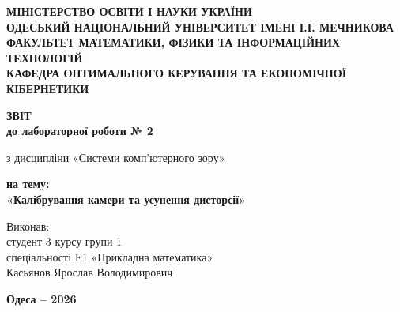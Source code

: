 \begin{titlepage}
    \thispagestyle{empty}
    \setlength{\parindent}{0pt}
    
    \begin{center}
        {\fontsize{12pt}{16pt}\selectfont\bfseries
        МІНІСТЕРСТВО ОСВІТИ І НАУКИ УКРАЇНИ\\[3pt]
        ОДЕСЬКИЙ НАЦІОНАЛЬНИЙ УНІВЕРСИТЕТ ІМЕНІ І.І. МЕЧНИКОВА\\[3pt]
        ФАКУЛЬТЕТ МАТЕМАТИКИ, ФІЗИКИ ТА ІНФОРМАЦІЙНИХ ТЕХНОЛОГІЙ\\[3pt]
        КАФЕДРА ОПТИМАЛЬНОГО КЕРУВАННЯ ТА ЕКОНОМІЧНОЇ КІБЕРНЕТИКИ\par}
    \end{center}

    \vspace{1.5cm}

    \begin{center}
        {\fontsize{18pt}{22pt}\selectfont\bfseries ЗВІТ\\
        до лабораторної роботи № 2\par}
        \vspace{0.4cm}
        {\fontsize{14pt}{18pt}\selectfont
        з дисципліни «Системи комп’ютерного зору»\par}
        \vspace{0.4cm}
        {\fontsize{16pt}{20pt}\selectfont\bfseries
        на тему:\\[6pt]
        «Калібрування камери та усунення дисторсії»\par}
    \end{center}

    \vspace{1.5cm}

    \hfill
    \begin{minipage}{0.60\textwidth}
        \raggedright
        {\fontsize{14pt}{19pt}\selectfont
        Виконав:\\[2pt]
        студент 3 курсу групи 1\\[2pt]
        спеціальності F1 «Прикладна математика»\\[2pt]
        Касьянов Ярослав Володимирович
        
        \vspace{0.8cm}
        }
    \end{minipage}

    \vfill

    \begin{center}
        {\fontsize{12pt}{14pt}\selectfont\bfseries Одеса -- 2026\par}
    \end{center}
\end{titlepage}

\setcounter{page}{2}

